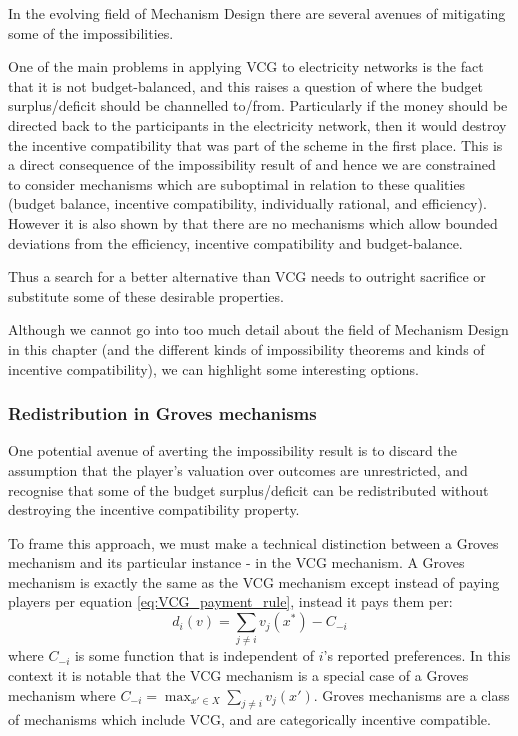 In the evolving field of Mechanism Design there are several avenues of mitigating some of the impossibilities.


One of the main problems in applying VCG to electricity networks is the fact that it is not budget-balanced, and this raises a question of where the budget surplus/deficit should be channelled to/from.
Particularly if the money should be directed back to the participants in the electricity network, then it would destroy the incentive compatibility that was part of the scheme in the first place.
This is a direct consequence of the impossibility result of \cite{29088} and hence we are constrained to consider mechanisms which are suboptimal in relation to these qualities (budget balance, incentive compatibility, individually rational, and efficiency).
However it is also shown by \cite{YI201679} that there are no mechanisms which allow bounded deviations from the efficiency, incentive compatibility and budget-balance.

Thus a search for a better alternative than VCG needs to outright sacrifice or substitute some of these desirable properties.

Although we cannot go into too much detail about the field of Mechanism Design in this chapter (and the different kinds of impossibility theorems and kinds of incentive compatibility), we can highlight some interesting options.

\subsubsection{Redistribution in Groves mechanisms}\label{subsubsection:groves_mechanisms}

One potential avenue of averting the impossibility result is to discard the assumption that the player's valuation over outcomes are unrestricted, and recognise that some of the budget surplus/deficit can be redistributed without destroying the incentive compatibility property.

To frame this approach, we must make a technical distinction between a Groves mechanism and its particular instance - in the VCG mechanism.
A Groves mechanism is exactly the same as the VCG mechanism except instead of paying players per equation \ref{eq:VCG_payment_rule}, instead it pays them per:
\begin{equation}\label{eq:Groves_payment_equation} d_i(v)=\sum_{j\ne i}v_j(x^*) - C_{-i} \end{equation}
where $C_{-i}$ is some function that is independent of $i$'s reported preferences.
In this context it is notable that the VCG mechanism is a special case of a Groves mechanism \citep{10.2307/1914085} where $C_{-i}= \max_{x'\in X}\sum_{j\ne i}v_j(x')$.
Groves mechanisms are a class of mechanisms which include VCG, and are categorically incentive compatible. 

